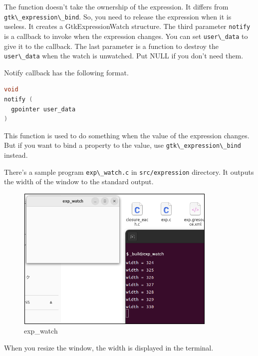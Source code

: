 The function doesn't take the ownership of the expression. It differs
from \passthrough{\lstinline!gtk\_expression\_bind!}. So, you need to
release the expression when it is useless. It creates a
GtkExpressionWatch structure. The third parameter
\passthrough{\lstinline!notify!} is a callback to invoke when the
expression changes. You can set \passthrough{\lstinline!user\_data!} to
give it to the callback. The last parameter is a function to destroy the
\passthrough{\lstinline!user\_data!} when the watch is unwatched. Put
NULL if you don't need them.

Notify callback has the following format.

\begin{lstlisting}[language=C]
void
notify (
  gpointer user_data
)
\end{lstlisting}

This function is used to do something when the value of the expression
changes. But if you want to bind a property to the value, use
\passthrough{\lstinline!gtk\_expression\_bind!} instead.

There's a sample program \passthrough{\lstinline!exp\_watch.c!} in
\passthrough{\lstinline!src/expression!} directory. It outputs the width
of the window to the standard output.

\begin{figure}
\centering
\includegraphics[width=9.6cm,height=6.9cm]{../image/exp_watch.png}
\caption{exp\_watch}
\end{figure}

When you resize the window, the width is displayed in the terminal.

